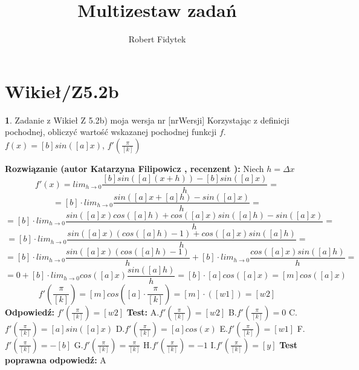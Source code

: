 \documentclass[12pt, a4paper]{article}
\title{Multizestaw zadań}
\author{Robert Fidytek}
\date{}
\theoremstyle{definition} %
\newtheorem{zad}{}
\newcommand{\kategoria}[1]{\section{#1}} %
\newcommand{\zadStart}[1]{\begin{zad}#1\newline} %
\newcommand{\zadStop}{\end{zad}}   %
\newcommand{\rozwStart}[2]{\noindent \textbf{Rozwiązanie (autor #1 , recenzent #2): }\newline} %
\newcommand{\rozwStop}{\newline}                                            %
\newcommand{\odpStart}{\noindent \textbf{Odpowiedź:}\newline}    %
\newcommand{\odpStop}{\newline}                                             %
\newcommand{\testStart}{\noindent \textbf{Test:}\newline} %
\newcommand{\testStop}{\newline} %
\newcommand{\kluczStart}{\noindent \textbf{Test poprawna odpowiedź:}\newline} %
\newcommand{\kluczStop}{\newline} %
\begin{document}
\maketitle


\kategoria{Wikieł/Z5.2b}
\zadStart{Zadanie z Wikieł Z 5.2b) moja wersja nr [nrWersji]}
Korzystając z definicji pochodnej, obliczyć wartość wskazanej pochodnej funkcji $f$.\\
 $f(x)=[b]sin([a]x)$, $f'(\frac{\pi}{[k]})$
\zadStop
\rozwStart{Katarzyna Filipowicz}{}
Niech $h=\Delta x$
$$
f'(x)=lim_{h\rightarrow 0} \frac{[b]sin([a](x+h))-[b]sin([a]x)}{h}=
$$ $$
=[b] \cdot lim_{h\rightarrow 0} \frac{sin([a]x+[a]h)-sin([a]x)}{h}=
$$ $$
=[b]\cdot lim_{h\rightarrow 0} \frac{sin([a]x)cos([a]h)+cos([a]x)sin([a]h)-sin([a]x)}{h}=
$$ $$
=[b]\cdot lim_{h\rightarrow 0} \frac{sin([a]x)(cos([a]h)-1)+cos([a]x)sin([a]h)}{h}=
$$ $$
=[b]\cdot lim_{h\rightarrow 0} \frac{sin([a]x)(cos([a]h)-1)}{h}+[b]\cdot lim_{h\rightarrow 0}  \frac{cos([a]x)sin([a]h)}{h}=
$$ $$
=0+[b]\cdot lim_{h\rightarrow 0} cos([a]x)\frac{sin([a]h)}{h}=[b]\cdot [a]cos([a]x)=[m]cos([a]x)
$$ $$
f'(\frac{\pi}{[k]})=[m]cos([a]\cdot \frac{\pi}{[k]})=[m] \cdot ([w1])=[w2]
$$
\rozwStop
\odpStart
$f'(\frac{\pi}{[k]})=[w2]$
\odpStop
\testStart
A.$f'(\frac{\pi}{[k]})=[w2]$
B.$f'(\frac{\pi}{[k]})=0$
C.$f'(\frac{\pi}{[k]})=[a]sin([a]x)$
D.$f'(\frac{\pi}{[k]})=[a]cos(x)$
E.$f'(\frac{\pi}{[k]})=[w1]$
F.$f'(\frac{\pi}{[k]})=-[b]$
G.$f'(\frac{\pi}{[k]})=\frac{\pi}{[k]}$
H.$f'(\frac{\pi}{[k]})=-1$
I.$f'(\frac{\pi}{[k]})=[y]$
\testStop
\kluczStart
A
\kluczStop
\end{document}
